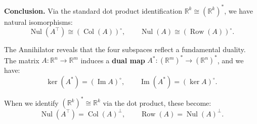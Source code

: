 \documentclass[11pt]{article}
\newcommand{\nul}{\operatorname{Nul}}
\newcommand{\col}{\operatorname{Col}}
\newcommand{\row}{\operatorname{Row}}
\begin{document}
\noindent\textbf{Conclusion.}  
Via the standard dot product identification $\mathbb{R}^k \cong (\mathbb{R}^k)^*$, we have natural isomorphisms:
\[
\boxed{\nul(A^\top) \cong (\col(A))^\circ}, \qquad
\boxed{\nul(A) \cong (\row(A))^\circ}.
\]



The Annihilator reveals that the four subspaces reflect a fundamental duality.  
The matrix $ A: \mathbb{R}^n \to \mathbb{R}^m $ induces a \textbf{dual map} $ A^*: (\mathbb{R}^m)^* \to (\mathbb{R}^n)^* $, and we have:
\[
\ker(A^*) = (\operatorname{Im} A)^\circ, \qquad \operatorname{Im}(A^*) = (\ker A)^\circ.
\]

When we identify $ (\mathbb{R}^k)^* \cong \mathbb{R}^k $ via the dot product, these become:
\[
\operatorname{Nul}(A^\top) = \operatorname{Col}(A)^\perp, \qquad \operatorname{Row}(A) = \operatorname{Nul}(A)^\perp.
\]
\end{document}
